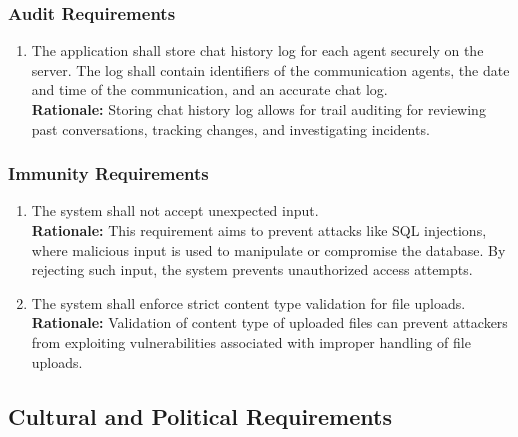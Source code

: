 \documentclass[]{article}
\begin{document}
\subsubsection{Audit Requirements}
\label{ssub:audit_requirements}
\begin{enumerate}[{SR-AU}1. ]
	\item The application shall store chat history log for each agent securely on the server. The log shall contain
	      identifiers of the communication agents, the date and time of the communication, and an accurate chat log. \\
	      {\bf Rationale:} Storing chat history log allows for trail auditing for reviewing past conversations, tracking changes,
	      and investigating incidents.
\end{enumerate}
\subsubsection{Immunity Requirements}
\label{ssub:immunity_requirements}
\begin{enumerate}[{SR-IM}1. ]
	\item The system shall not accept unexpected input. \\
	      {\bf Rationale:} This requirement aims to prevent attacks like SQL injections, where malicious input is used to manipulate or compromise the database. By rejecting such input, the system prevents unauthorized
	      access attempts.
	\item  The system shall enforce strict content type validation for file uploads. \\
	      {\bf Rationale:} Validation of content type of uploaded files can prevent attackers from exploiting vulnerabilities associated with improper handling of file uploads.
\end{enumerate}


\subsection{Cultural and Political Requirements}
\label{sub:cultural_and_political_requirements}
\end{document}
